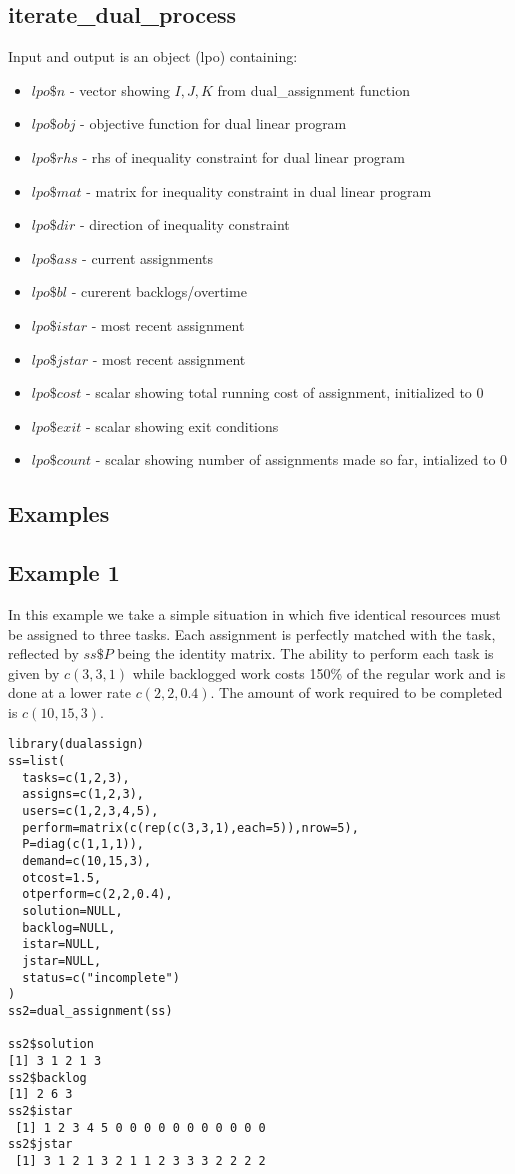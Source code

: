 \documentclass[12pt]{article}
\begin{document}
\subsection{iterate\_dual\_process}
Input and output is an object (lpo) containing:
\begin{itemize}
\item $lpo\$n$ - vector showing $I,J,K$ from dual\_assignment function
\item $lpo\$obj$ - objective function for dual linear program
\item $lpo\$rhs$ - rhs of inequality constraint for dual linear program
\item $lpo\$mat$ - matrix for inequality constraint in dual linear program
\item $lpo\$dir$ - direction of inequality constraint
\item $lpo\$ass$ - current assignments
\item $lpo\$bl$ - curerent backlogs/overtime
\item $lpo\$istar$ - most recent assignment
\item $lpo\$jstar$ - most recent assignment
\item $lpo\$cost$ - scalar showing total running cost of assignment, initialized to $0$
\item $lpo\$exit$ - scalar showing exit conditions
\item $lpo\$count$ - scalar showing number of assignments made so far, intialized to $0$
\end{itemize}

\subsection{Examples}
\subsection{Example 1}

In this example we take a simple situation in which five identical resources must be assigned to three tasks. Each assignment is perfectly matched with the task, reflected by $ss\$P$ being the identity matrix. The ability to perform each task is given by $c(3,3,1)$ while backlogged work costs 150\% of the regular work and is done at a lower rate $c(2,2,0.4)$. The amount of work required to be completed is $c(10,15,3)$.

\begin{verbatim}library(dualassign)
ss=list(
  tasks=c(1,2,3),
  assigns=c(1,2,3),
  users=c(1,2,3,4,5),
  perform=matrix(c(rep(c(3,3,1),each=5)),nrow=5),
  P=diag(c(1,1,1)),
  demand=c(10,15,3),
  otcost=1.5,
  otperform=c(2,2,0.4),
  solution=NULL,
  backlog=NULL,
  istar=NULL,
  jstar=NULL,
  status=c("incomplete")
)
ss2=dual_assignment(ss)

ss2$solution
[1] 3 1 2 1 3
ss2$backlog
[1] 2 6 3
ss2$istar
 [1] 1 2 3 4 5 0 0 0 0 0 0 0 0 0 0 0
ss2$jstar
 [1] 3 1 2 1 3 2 1 1 2 3 3 3 2 2 2 2
\end{verbatim}
\end{document}
